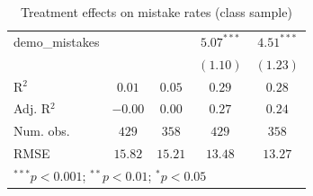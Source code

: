 \documentclass[
  12,
  letterpaper,
  DIV=11,
  numbers=noendperiod]{scrartcl}
\begin{document}
\begin{table}
{\begin{center}
\begin{tabular}{l c c c c}
demo\_mistakes          &               &               & $5.07^{***}$ & $4.51^{***}$ \\
                        &               &               & $(1.10)$     & $(1.23)$     \\
\hline
R$^2$                   & $0.01$        & $0.05$        & $0.29$       & $0.28$       \\
Adj. R$^2$              & $-0.00$       & $0.00$        & $0.27$       & $0.24$       \\
Num. obs.               & $429$         & $358$         & $429$        & $358$        \\
RMSE                    & $15.82$       & $15.21$       & $13.48$      & $13.27$      \\
\hline
\multicolumn{5}{l}{\scriptsize{$^{***}p<0.001$; $^{**}p<0.01$; $^{*}p<0.05$}}
\end{tabular}
\label{table:coefficients}
\end{center}

}

\caption{\label{tbl-reg-mistakes-class}Treatment effects on mistake
rates (class sample)}

\end{table}%
\end{document}

